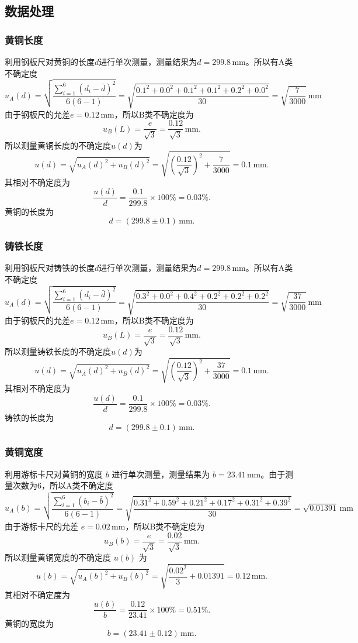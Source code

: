 \documentclass[zihao=5, UTF8]{article}
\theoremstyle{MyLineTheoremStyle} %
\theoremstyle{MyBlockTheoremStyle} %
\theoremstyle{MySubsubsectionStyle} %
\begin{document}
\subsection{数据处理}
\subsubsection{黄铜长度}
利用钢板尺对黄铜的长度\( d \)进行单次测量，测量结果为\( d = 299.8 \, \text{mm} \)。所以有A类不确定度
\[
u_A (d) = \sqrt{\frac{\sum_{i=1}^{6} (d_i - \bar{d})^2}{6(6-1)}} = \sqrt{\frac{0.1^2 + 0.0^2 + 0.1^2 + 0.1^2 + 0.2^2 + 0.0^2}{30}} = \sqrt{\dfrac{7}{3000}} \, \text{mm}
\]
由于钢板尺的允差\( e = 0.12 \, \text{mm} \)，所以B类不确定度为
\[ u_B (L) = \frac{e}{\sqrt{3}} = \frac{0.12}{\sqrt{3}} \, \text{mm}. \]
所以测量黄铜长度的不确定度\( u(d) \)为
\[ u(d) = \sqrt{u_A (d)^2 + u_B (d)^2} = \sqrt{\left(\frac{0.12}{\sqrt{3}}\right)^2 + \frac{7}{3000}} = 0.1 \, \text{mm}. \]
其相对不确定度为
\[ \frac{u(d)}{d} = \frac{0.1}{299.8} \times 100\% = 0.03\%. \]
黄铜的长度为
\[ d = (299.8 \pm 0.1) \, \text{mm}. \]

\subsubsection{铸铁长度}
利用钢板尺对铸铁的长度\( d \)进行单次测量，测量结果为\( d = 299.8 \, \text{mm} \)。所以有A类不确定度
\[
u_A (d) = \sqrt{\frac{\sum_{i=1}^{6} (d_i - \bar{d})^2}{6(6-1)}} = \sqrt{\frac{0.3^2 + 0.0^2 + 0.4^2 + 0.2^2 + 0.2^2 + 0.2^2}{30}} = \sqrt{\dfrac{37}{3000}} \, \text{mm}
\]
由于钢板尺的允差\( e = 0.12 \, \text{mm} \)，所以B类不确定度为
\[ u_B (L) = \frac{e}{\sqrt{3}} = \frac{0.12}{\sqrt{3}} \, \text{mm}. \]
所以测量铸铁长度的不确定度\( u(d) \)为
\[ u(d) = \sqrt{u_A (d)^2 + u_B (d)^2} = \sqrt{\left(\frac{0.12}{\sqrt{3}}\right)^2 + \frac{37}{3000}} = 0.1 \, \text{mm}. \]
其相对不确定度为
\[ \frac{u(d)}{d} = \frac{0.1}{299.8} \times 100\% = 0.03\%. \]
铸铁的长度为
\[ d = (299.8 \pm 0.1) \, \text{mm}. \]

\subsubsection{黄铜宽度}
利用游标卡尺对黄铜的宽度 \( b \) 进行单次测量，测量结果为 \( b = 23.41 \, \text{mm} \)。由于测量次数为6，所以A类不确定度
\[ u_A (b) = \sqrt{\frac{\sum_{i=1}^{6}(b_i - \bar{b})^2}{6(6-1)}} = \sqrt{\frac{0.31^2 + 0.59^2 + 0.21^2 + 0.17^2 + 0.31^2 + 0.39^2}{30}} = \sqrt{0.01391} \, \text{mm} \]
由于游标卡尺的允差 \( e = 0.02 \, \text{mm} \)，所以B类不确定度为
\[ u_B (b) = \frac{e}{\sqrt{3}} = \frac{0.02}{\sqrt{3}} \, \text{mm}. \]
所以测量黄铜宽度的不确定度 \( u(b) \) 为
\[ u(b) = \sqrt{u_A (b)^2 + u_B (b)^2} = \sqrt{\frac{0.02^2}{3} + 0.01391} = 0.12 \, \text{mm}. \]
其相对不确定度为
\[ \frac{u(b)}{b} = \frac{0.12}{23.41} \times 100\% = 0.51\%. \]
黄铜的宽度为
\[ b = (23.41 \pm 0.12) \, \text{mm}. \]
\end{document}
